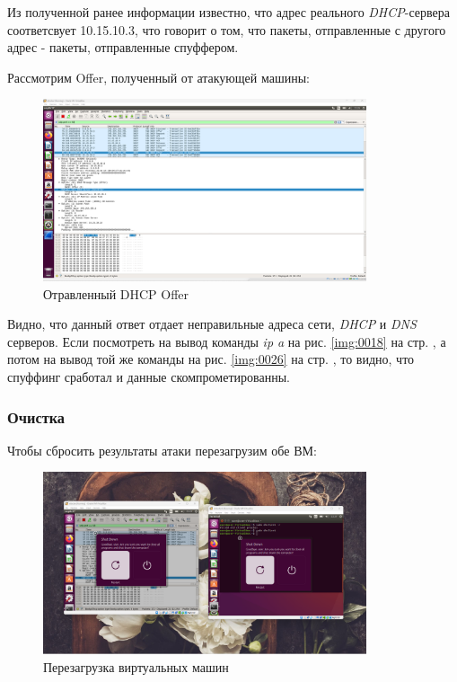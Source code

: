 \documentclass[a4paper]{article}
\begin{document}
  Из полученной ранее информации известно, что адрес реального \textit{DHCP}-сервера соответсвует
  10.15.10.3, что говорит о том, что пакеты, отправленные с другого адрес - пакеты, отправленные спуффером.

  Рассмотрим Offer, полученный от атакующей машины:

  \begin{figure}[H]
    \centering
    \includegraphics[width=0.85\textwidth]{02_00 (37)}
    \caption{Отравленный DHCP Offer}
    \label{img:0027}
  \end{figure}

  Видно, что данный ответ отдает неправильные адреса сети, \textit{DHCP} и \textit{DNS} серверов.
  Если посмотреть на вывод команды \textit{ip a} на рис. \ref{img:0018} на стр. \pageref{img:0018},
  а потом на вывод той же команды на рис. \ref{img:0026} на стр. \pageref{img:0026}, то видно,
  что спуффинг сработал и данные скомпрометированны.

  \subsubsection{Очистка}

  Чтобы сбросить результаты атаки перезагрузим обе ВМ:

  \begin{figure}[H]
    \centering
    \includegraphics[width=0.85\textwidth]{02_00 (38)}
    \caption{Перезагрузка виртуальных машин}
    \label{img:0028}
  \end{figure}
\end{document}

